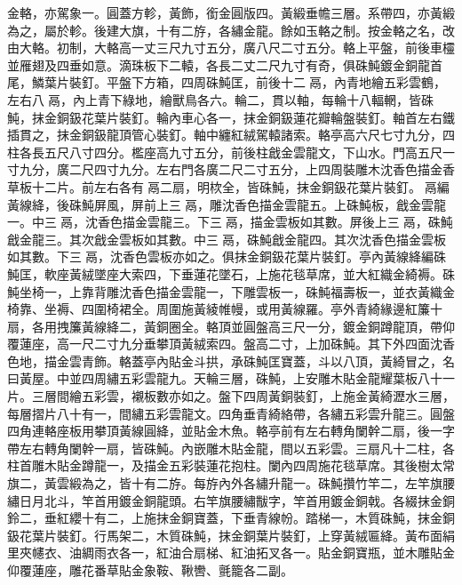 \begin{pinyinscope}
金輅，亦駕象一。圓蓋方軫，黃飾，銜金圓版四。黃緞垂幨三層。系帶四，亦黃緞為之，屬於軫。後建大旗，十有二斿，各繡金龍。餘如玉輅之制。按金輅之名，改由大輅。初制，大輅高一丈三尺九寸五分，廣八尺二寸五分。輅上平盤，前後車欞並雁翅及四垂如意。滴珠板下二轅，各長二丈二尺九寸有奇，俱硃魨鍍金銅龍首尾，鱗葉片裝釘。平盤下方箱，四周硃魨匡，前後十二鬲，內青地繪五彩雲鶴，左右八鬲，內上青下綠地，繪獸鳥各六。輪二，貫以軸，每輪十八輻輞，皆硃魨，抹金銅鈒花葉片裝釘。輪內車心各一，抹金銅鈒蓮花瓣輪盤裝釘。軸首左右鐵插貫之，抹金銅鈒龍頂管心裝釘。軸中纏紅絨駕轅諸索。輅亭高六尺七寸九分，四柱各長五尺八寸四分。檻座高九寸五分，前後柱戧金雲龍文，下山水。門高五尺一寸九分，廣二尺四寸九分。左右門各廣二尺二寸五分，上四周裝雕木沈香色描金香草板十二片。前左右各有鬲二扇，明栨全，皆硃魨，抹金銅鈒花葉片裝釘。鬲編黃線絳，後硃魨屏風，屏前上三鬲，雕沈香色描金雲龍五。上硃魨板，戧金雲龍一。中三鬲，沈香色描金雲龍三。下三鬲，描金雲板如其數。屏後上三鬲，硃魨戧金龍三。其次戧金雲板如其數。中三鬲，硃魨戧金龍四。其次沈香色描金雲板如其數。下三鬲，沈香色雲板亦如之。俱抹金銅鈒花葉片裝釘。亭內黃線絳編硃魨匡，軟座黃絨墜座大索四，下垂蓮花墜石，上施花毯草席，並大紅織金綺褥。硃魨坐椅一，上靠背雕沈香色描金雲龍一，下雕雲板一，硃魨福壽板一，並衣黃織金椅靠、坐褥、四圍椅裙全。周圍施黃綾帷幔，或用黃線羅。亭外青綺緣邊紅簾十扇，各用拽簾黃線絳二，黃銅圈全。輅頂並圓盤高三尺一分，鍍金銅蹲龍頂，帶仰覆蓮座，高一尺二寸九分垂攀頂黃絨索四。盤高二寸，上加硃魨。其下外四面沈香色地，描金雲青飾。輅蓋亭內貼金斗拱，承硃魨匡寶蓋，斗以八頂，黃綺冒之，名曰黃屋。中並四周繡五彩雲龍九。天輪三層，硃魨，上安雕木貼金龍耀葉板八十一片。三層間繪五彩雲，襯板數亦如之。盤下四周黃銅裝釘，上施金黃綺瀝水三層，每層摺片八十有一，間繡五彩雲龍文。四角垂青綺絡帶，各繡五彩雲升龍三。圓盤四角連輅座板用攀頂黃線圓絳，並貼金木魚。輅亭前有左右轉角闌幹二扇，後一字帶左右轉角闌幹一扇，皆硃魨。內嵌雕木貼金龍，間以五彩雲。三扇凡十二柱，各柱首雕木貼金蹲龍一，及描金五彩裝蓮花抱柱。闌內四周施花毯草席。其後樹太常旗二，黃雲緞為之，皆十有二斿。每斿內外各繡升龍一。硃魨攢竹竿二，左竿旗腰繡日月北斗，竿首用鍍金銅龍頭。右竿旗腰繡黻字，竿首用鍍金銅戟。各綴抹金銅鈴二，垂紅纓十有二，上施抹金銅寶蓋，下垂青線帉。踏梯一，木質硃魨，抹金銅鈒花葉片裝釘。行馬架二，木質硃魨，抹金銅葉片裝釘，上穿黃絨匾絳。黃布面絹里夾幰衣、油綢雨衣各一，紅油合扇梯、紅油拓叉各一。貼金銅寶瓶，並木雕貼金仰覆蓮座，雕花番草貼金象鞍、鞦轡、氈籠各二副。


\end{pinyinscope}
